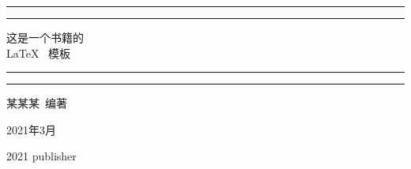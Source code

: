 
\begin{titlepage}
    \centering   %
    \scshape     %
    \vspace*{\baselineskip}   %

	
    \rule{\textwidth}{1.6pt}\vspace*{-\baselineskip}\vspace*{2pt} %
    \rule{\textwidth}{0.4pt}  %
	
    \vspace{0.75\baselineskip} %

    {\LARGE\heiti 这是一个书籍的 \\ \LaTeX ~ 模板\\} %
	
	\vspace{0.75\baselineskip} %
	
	\rule{\textwidth}{0.4pt}\vspace*{-\baselineskip}\vspace{3.2pt} %
	\rule{\textwidth}{1.6pt} %
	
	\vspace{2\baselineskip} %
	
	
    {\fangsong\Large 某某某~编著 \\[10pt] } %
	
    {\fangsong\large 2021年3月\\} %

	\vspace{0.5\baselineskip} %
	
	
	\vfill %
	
	
	\plogo %
	
	\vspace{0.3\baselineskip} %
	
	2021 %
	{\large publisher} %
\end{titlepage}
